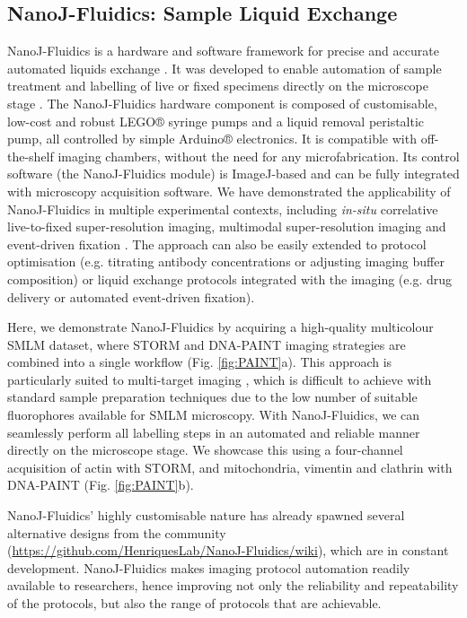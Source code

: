 \subsection*{NanoJ-Fluidics: Sample Liquid Exchange}
 NanoJ-Fluidics is a hardware and software framework for precise and accurate automated liquids exchange \cite{almada2018automating}. It was developed to enable automation of sample treatment and labelling of live or fixed specimens directly on the microscope stage \cite{almada2018automating, dix2018role}. The NanoJ-Fluidics hardware component is composed of customisable, low-cost and robust LEGO® syringe pumps and a liquid removal peristaltic pump, all controlled by simple Arduino® electronics. It is compatible with off-the-shelf imaging chambers, without the need for any microfabrication. Its control software (the NanoJ-Fluidics module) is ImageJ-based and can be fully integrated with microscopy acquisition software. We have demonstrated the applicability of NanoJ-Fluidics in multiple experimental contexts, including \textit{in-situ} correlative live-to-fixed super-resolution imaging, multimodal super-resolution imaging and event-driven fixation \cite{almada2018automating}. The approach can also be easily extended to protocol optimisation (e.g. titrating antibody concentrations or adjusting imaging buffer composition) or liquid exchange protocols integrated with the imaging (e.g. drug delivery or automated event-driven fixation).

 Here, we demonstrate NanoJ-Fluidics by acquiring a high-quality multicolour SMLM dataset, where STORM and DNA-PAINT \cite{jungmann2014multiplexed} imaging strategies are combined into a single workflow (Fig. \ref{fig:PAINT}a). This approach is particularly suited to multi-target imaging \cite{dempsey2011evaluation}, which is difficult to achieve with standard sample preparation techniques due to the low number of suitable fluorophores available for SMLM microscopy. With NanoJ-Fluidics, we can seamlessly perform all labelling steps in an automated and reliable manner directly on the microscope stage. We showcase this using a four-channel acquisition of actin with STORM, and mitochondria, vimentin and clathrin with DNA-PAINT (Fig. \ref{fig:PAINT}b). 

 NanoJ-Fluidics' highly customisable nature has already spawned several alternative designs from the community (\href{https://github.com/HenriquesLab/NanoJ-Fluidics/wiki}{https://github.com/HenriquesLab/NanoJ-Fluidics/wiki}), which are in constant development. NanoJ-Fluidics makes imaging protocol automation readily available to researchers, hence improving not only the reliability and repeatability of the protocols, but also the range of protocols that are achievable.  

